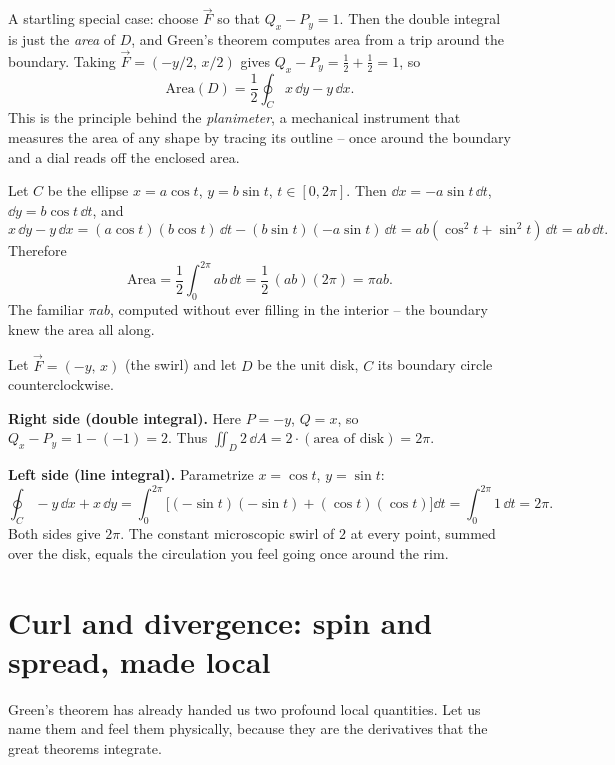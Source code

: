 A startling special case: choose $\vec F$ so that $Q_x - P_y = 1$. Then the double
integral is just the \emph{area} of $D$, and Green's theorem computes area from a
trip around the boundary. Taking $\vec F=(-y/2,\,x/2)$ gives
$Q_x-P_y=\tfrac12+\tfrac12=1$, so
\[
  \text{Area}(D) = \frac{1}{2}\oint_C x\,\dd y - y\,\dd x.
\]
This is the principle behind the \emph{planimeter}, a mechanical instrument that
measures the area of any shape by tracing its outline -- once around the boundary
and a dial reads off the enclosed area.

\begin{example}
\label{ch35:ex-ellipse}
Let $C$ be the ellipse $x=a\cos t$, $y=b\sin t$, $t\in[0,2\pi]$. Then
$\dd x = -a\sin t\,\dd t$, $\dd y = b\cos t\,\dd t$, and
\[
  x\,\dd y - y\,\dd x
  = (a\cos t)(b\cos t)\,\dd t - (b\sin t)(-a\sin t)\,\dd t
  = ab(\cos^2 t + \sin^2 t)\,\dd t = ab\,\dd t.
\]
Therefore
\[
  \text{Area} = \frac12\int_0^{2\pi} ab\,\dd t = \frac12\,(ab)(2\pi) = \pi ab.
\]
The familiar $\pi a b$, computed without ever filling in the interior -- the
boundary knew the area all along.
\end{example}

\begin{example}
\label{ch35:ex-green-verify}
Let $\vec F=(-y,\,x)$ (the swirl) and let $D$ be the unit disk, $C$ its boundary
circle counterclockwise.

\textbf{Right side (double integral).} Here $P=-y$, $Q=x$, so
$Q_x - P_y = 1 - (-1) = 2$. Thus
$\iint_D 2\,\dd A = 2\cdot(\text{area of disk}) = 2\pi.$

\textbf{Left side (line integral).} Parametrize $x=\cos t$, $y=\sin t$:
\[
  \oint_C -y\,\dd x + x\,\dd y
  = \int_0^{2\pi}\big[(-\sin t)(-\sin t) + (\cos t)(\cos t)\big]\dd t
  = \int_0^{2\pi} 1\,\dd t = 2\pi.
\]
Both sides give $2\pi$. The constant microscopic swirl of $2$ at every point,
summed over the disk, equals the circulation you feel going once around the rim.
\end{example}

\section{Curl and divergence: spin and spread, made local}
\label{ch35:curl-div}

Green's theorem has already handed us two profound local quantities. Let us name
them and feel them physically, because they are the derivatives that the great
theorems integrate.

